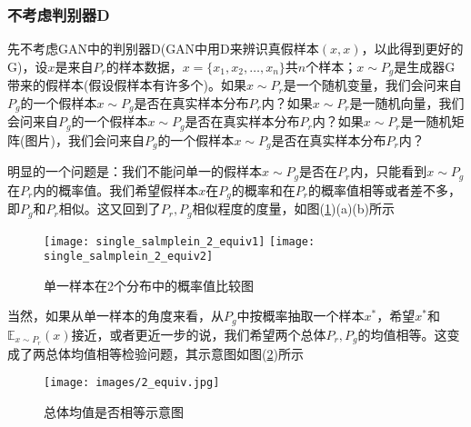         \subsubsection{不考虑判别器D}
            \par
            先不考虑GAN中的判别器D(GAN中用D来辨识真假样本$(x,x)$，以此得到更好的G)，设$x$是来自$P_r$的样本数据，$x= \{x_1,x_2,\dots,x_n\}$共$n$个样本；$x\sim P_g$是生成器G带来的假样本(假设假样本有许多个)。如果$x\sim P_r$是一个随机变量，我们会问来自$P_g$的一个假样本$x\sim P_g$是否在真实样本分布$P_r$内？如果$x\sim P_r$是一随机向量，我们会问来自$P_g$的一个假样本$x\sim P_g$是否在真实样本分布$P_r$内？如果$x\sim P_r$是一随机矩阵(图片)，我们会问来自$P_g$的一个假样本$x\sim P_g$是否在真实样本分布$P_r$内？
            \par
            明显的一个问题是：我们不能问单一的假样本$x\sim P_g$是否在$P_r$内，只能看到$x\sim P_g$在$P_r$内的概率值。我们希望假样本$x$在$P_g$的概率和在$P_r$的概率值相等或者差不多，即$P_g$和$P_r$相似。这又回到了$P_r,P_g$相似程度的度量，如图(\ref{fig:单一样本在2个分布中的概率值比较图})(a)(b)所示
            \begin{figure}[H]
            \centering
            \texttt{[image: single\_salmplein\_2\_equiv1]}
            \qquad
            \texttt{[image: single\_salmplein\_2\_equiv2]}
            \caption{单一样本在2个分布中的概率值比较图}
            \label{fig:单一样本在2个分布中的概率值比较图}
            \end{figure}
            当然，如果从单一样本的角度来看，从$P_g$中按概率抽取一个样本$x^*$，希望$x^*$和$\mathbb{E}_{x\sim P_r}(x)$接近，或者更近一步的说，我们希望两个总体$P_r,P_g$的均值相等。这变成了两总体均值相等检验问题，其示意图如图(\ref{fig:2总体均值是否相等示意图})所示
                \begin{figure}[H]
                \centering
                \texttt{[image: images/2\_equiv.jpg]}
                \caption{总体均值是否相等示意图}
                \label{fig:2总体均值是否相等示意图}
                \end{figure}

